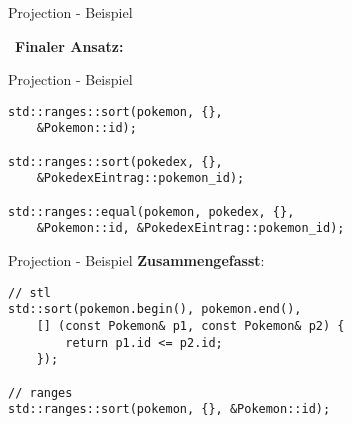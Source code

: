 \begin{frame}{Projection - Beispiel}
    \begin{center}
        \✨ \ \textbf{Finaler Ansatz:} \ \✨
    \end{center}
\end{frame}

\begin{frame}[fragile]{Projection - Beispiel}
    \begin{verbatim}
std::ranges::sort(pokemon, {},
    &Pokemon::id);

std::ranges::sort(pokedex, {},
    &PokedexEintrag::pokemon_id);

std::ranges::equal(pokemon, pokedex, {},
    &Pokemon::id, &PokedexEintrag::pokemon_id);
    \end{verbatim}
\end{frame}

\begin{frame}[fragile]{Projection - Beispiel}
    \textbf{Zusammengefasst}:

    \begin{verbatim}
// stl
std::sort(pokemon.begin(), pokemon.end(),
    [] (const Pokemon& p1, const Pokemon& p2) {
        return p1.id <= p2.id;
    });

// ranges
std::ranges::sort(pokemon, {}, &Pokemon::id);
    \end{verbatim}
\end{frame}